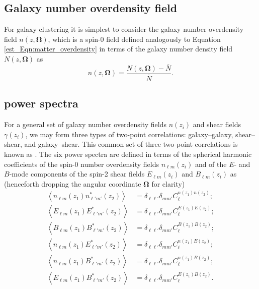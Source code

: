 \subsection{Galaxy number overdensity field}

For galaxy clustering it is simplest to consider the galaxy number overdensity field $n \left( z, \bm{\Omega} \right)$, which is a spin-0 field defined analogously to Equation \eqref{est_Eqn:matter_overdensity} in terms of the galaxy number density field $N \left( z, \bm{\Omega} \right)$ as
\begin{equation}
n \left( z, \bm{\Omega} \right) =
\frac{N \left( z, \bm{\Omega} \right) - \overline{N}}{\overline{N}}.
\end{equation}

\subsection{\texorpdfstring{\ttp{}}{3x2 pt} power spectra}

For a general set of galaxy number overdensity fields $n \left( z_i \right)$ and shear fields $\gamma \left( z_i \right)$, we may form three types of two-point correlations: galaxy--galaxy, shear--shear, and galaxy--shear. This common set of three two-point correlations is known as \ttp{}. The six \ttp{} power spectra are defined in terms of the spherical harmonic coefficients of the spin-0 number overdensity fields $n_{\ell m} \left( z_i \right)$ and of the $E$- and $B$-mode components of the spin-2 shear fields $E_{\ell m} \left( z_i \right)$ and $B_{\ell m} \left( z_i \right)$ as (henceforth dropping the angular coordinate $\bm{\Omega}$ for clarity)
\begin{align}
\left\langle n_{\ell m} \left( z_1 \right)
n_{\ell' m'}^* \left( z_2 \right) \right\rangle
&= \delta_{\ell \ell'} \delta_{m m'}
C_\ell^{n \left( z_1 \right) n \left( z_2 \right)};
\\[1em]
\left\langle E_{\ell m} \left( z_1 \right)
E_{\ell' m'}^* \left( z_2 \right) \right\rangle
&= \delta_{\ell \ell'} \delta_{m m'}
C_\ell^{E \left( z_1 \right) E \left( z_2 \right)};
\\[1em]
\left\langle B_{\ell m} \left( z_1 \right)
B_{\ell' m'}^* \left( z_2 \right) \right\rangle
&= \delta_{\ell \ell'} \delta_{m m'}
C_\ell^{B \left( z_1 \right) B \left( z_2 \right)};
\\[1em]
\left\langle n_{\ell m} \left( z_1 \right)
E_{\ell' m'}^* \left( z_2 \right) \right\rangle
&= \delta_{\ell \ell'} \delta_{m m'}
C_\ell^{n \left( z_1 \right) E \left( z_2 \right)};
\\[1em]
\left\langle n_{\ell m} \left( z_1 \right)
B_{\ell' m'}^* \left( z_2 \right) \right\rangle
&= \delta_{\ell \ell'} \delta_{m m'}
C_\ell^{n \left( z_1 \right) B \left( z_2 \right)};
\\[1em]
\left\langle E_{\ell m} \left( z_1 \right)
B_{\ell' m'}^* \left( z_2 \right) \right\rangle
&= \delta_{\ell \ell'} \delta_{m m'}
C_\ell^{E \left( z_1 \right) B \left( z_2 \right)}.
\end{align}

